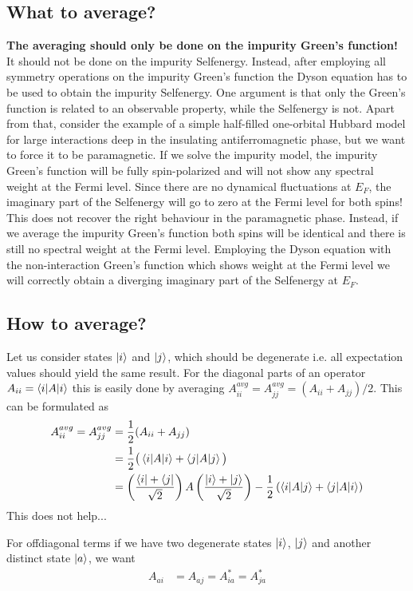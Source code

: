 \documentclass[12pt,a4paper]{scrartcl}
\numberwithin{equation}{section}
\begin{document}
\subsection{What to average?}
\textbf{The averaging should only be done on the impurity Green's function!}
It should not be done on the impurity Selfenergy. Instead, after employing
all symmetry operations on the impurity Green's function
the Dyson equation has to be used to obtain the impurity Selfenergy.
One argument is that only the Green's function is related to an observable property, while 
the Selfenergy is not. 
Apart from that, consider the example
of a simple half-filled one-orbital Hubbard model for large interactions deep in the 
insulating antiferromagnetic phase, but we want to force it to be paramagnetic.
If we solve the impurity model, the impurity Green's function will be fully spin-polarized
and will not show any spectral weight at the Fermi level.
Since there are no dynamical fluctuations at $E_F$, the imaginary part of the Selfenergy 
will go to zero at the Fermi level for both spins! This does not recover the right behaviour
in the paramagnetic phase.
Instead, if we average the impurity Green's function both spins will be identical
and there is still no spectral weight at the Fermi level. Employing the Dyson
equation with the non-interaction Green's function which shows weight at the Fermi level
we will correctly obtain a diverging imaginary part of the Selfenergy at $E_F$.

\subsection{How to average?}
Let us consider states $\ket{i}$ and $\ket{j}$, which should be degenerate i.e. 
all expectation values should yield the same result. 
For the diagonal parts of an operator $A_{ii} = \braket{i|A|i}$ 
this is easily done by averaging $A^{avg}_{ii} = A^{avg}_{jj} = (A_{ii}+A_{jj})/2$.
This can be formulated as
\begin{align}
 A^{avg}_{ii} = A^{avg}_{jj}	
 &= \frac{1}{2} (A_{ii}+A_{jj}) \\
 &= \frac{1}{2} \big(\braket{i|A|i} + \braket{j|A|j} \big) \\
 &= \left( \frac{\bra{i}+\bra{j}}{\sqrt{2}} \right) A \left( \frac{\ket{i}+\ket{j}}{\sqrt{2}} \right)
    - \frac{1}{2} \left( \braket{i|A|j} + \braket{j|A|i} \right)
\end{align}
This does not help...

For offdiagonal terms if we have two degenerate states $\ket{i}$, $\ket{j}$ and 
another distinct state $\ket{a}$, we want
\begin{align}
 A_{ai} &= A_{aj} = A_{ia}^* = A_{ja}^*
\end{align}
\end{document}
